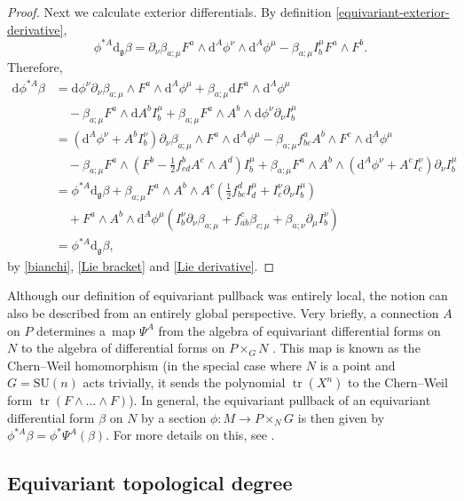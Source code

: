 \documentclass[10pt,a4paper]{amsart}
\newcommand{\g}{{\mathfrak{g}}}
\newcommand{\SU}{{\mathrm{SU}}}
\newcommand{\1}{{\mathbb{1}}}
\def \d{\mathrm{d}}
\newcommand{\tr}{{\operatorname{tr}}}
\numberwithin{equation}{section}
\begin{document}
\begin{proof}
Next we calculate exterior differentials. By definition \eqref{equivariant-exterior-derivative},
\begin{equation*}
\phi^{\ast A}\d_\g\beta = \partial_\nu\beta_{a;\mu}F^a\wedge \d^A\phi^\nu\wedge \d^A\phi^\mu - \beta_{a;\mu}I_b^\mu F^a\wedge F^b.
\end{equation*}
Therefore,
\begin{align*}
\d\phi^{\ast A}\beta &=\d\phi^\nu\partial_\nu\beta_{a;\mu}\wedge F^a\wedge \d^A\phi^\mu + \beta_{a;\mu}\d F^a\wedge \d^A\phi^\mu \nonumber\\
&\quad -\beta_{a;\mu}F^a\wedge\d A^b I_b^\mu + \beta_{a;\mu}F^a\wedge A^b\wedge \d\phi^\nu\partial_\nu I_b^\mu \\
&= (\d^A\phi^\nu+A^bI_b^\nu)\partial_\nu\beta_{a;\mu}\wedge F^a\wedge \d^A\phi^\mu
- \beta_{a;\mu}f^a_{bc}A^b\wedge F^c\wedge \d^A\phi^\mu \nonumber\\
&\quad -\beta_{a;\mu}F^a\wedge (F^b-\tfrac12 f^b_{cd}A^c\wedge A^d) I_b^\mu
+ \beta_{a;\mu}F^a\wedge A^b\wedge (\d^A\phi^\nu+A^cI_c^\nu) \partial_\nu I_b^\mu \\
&= \phi^{\ast A}\d_\g \beta + \beta_{a;\mu}F^a\wedge A^b\wedge A^c (\tfrac12 f_{bc}^dI_d^\mu +I_c^\nu\partial_\nu I_b^\mu) \nonumber \\
&\quad+ F^a\wedge A^b\wedge \d^A\phi^\mu (I_b^\nu\partial_\nu\beta_{a;\mu}+f_{ab}^c\beta_{c;\mu} +\beta_{a;\nu}\partial_\mu I_b^\nu )\\
&= \phi^{\ast A}\d_\g \beta,
\end{align*}
by \eqref{bianchi}, \eqref{Lie bracket} and \eqref{Lie derivative}.
\end{proof}

Although our definition of equivariant pullback was entirely local, the notion can also be described from an entirely global perspective. Very briefly, a connection $A$ on $P$ determines a~map $\Psi^A$ from the algebra of equivariant differential forms on $N$ to the algebra of differential forms on $P\times_GN$ \cite{berlineGetzlerVergne2003}. This map is known as the Chern--Weil homomorphism (in the special case where $N$ is a point and $G=\SU(n)$ acts trivially, it sends the polynomial $\tr(X^n)$ to the Chern--Weil form $\tr(F\wedge\dots\wedge F)$). In general, the equivariant pullback of an equivariant differential form $\beta$ on $N$ by a section $\phi\colon M\to P\times_N G$ is then given by $\phi^{\ast A}\beta = \phi^\ast \Psi^A(\beta)$. For more details on this, see \cite{berlineGetzlerVergne2003}.

\subsection{Equivariant topological degree}%
\end{document}
